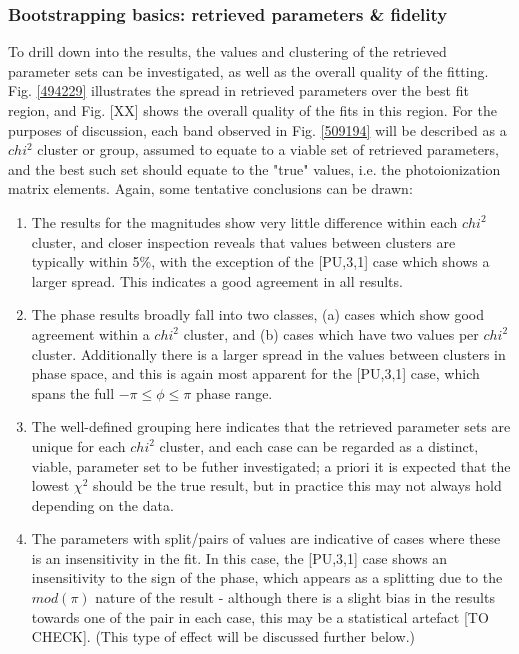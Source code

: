 \subsubsection{Bootstrapping basics: retrieved parameters \& fidelity}

To drill down into the results, the values and clustering of the retrieved parameter sets can be investigated, as well as the overall quality of the fitting. Fig. \ref{494229} illustrates the spread in retrieved parameters over the best fit region, and Fig. [XX] shows the overall quality of the fits in this region. For the purposes of discussion, each band observed in Fig. \ref{509194} will be described as a $chi^2$ cluster or group, assumed to equate to a viable set of retrieved parameters, and the best such set should equate to the "true" values, i.e. the photoionization matrix elements. Again, some tentative conclusions can be drawn:

\begin{enumerate}
\item The results for the magnitudes show very little difference within each $chi^2$ cluster, and closer inspection reveals that values between clusters are typically within 5\%, with the exception of the [PU,3,1] case which shows a larger spread. This indicates a good agreement in all results.
\item The phase results broadly fall into two classes, (a) cases which show good agreement within a $chi^2$ cluster, and (b) cases which have two values per $chi^2$ cluster. Additionally there is a larger spread in the values between clusters in phase space, and this is again most apparent for the [PU,3,1] case, which spans the full $-\pi\leq\phi\leq\pi$ phase range.
\item The well-defined grouping here indicates that the retrieved parameter sets are unique for each $chi^2$ cluster, and each case can be regarded as a distinct, viable, parameter set to be futher investigated; a priori it is expected that the lowest $\chi^2$ should be the true result, but in practice this may not always hold depending on the data.
\item The parameters with split/pairs of values are indicative of cases where these is an insensitivity in the fit. In this case, the [PU,3,1] case shows an insensitivity to the sign of the phase, which appears as a splitting due to the $mod(\pi)$ nature of the result - although there is a slight bias in the results towards one of the pair in each case, this may be a statistical artefact [TO CHECK]. (This type of effect will be discussed further below.)
\end{enumerate}

